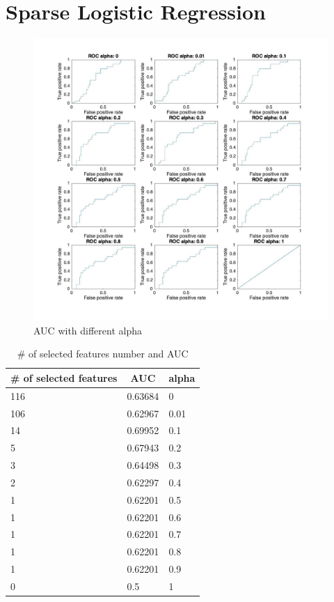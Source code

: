 \documentclass{article}
\begin{document}
\section{Sparse Logistic Regression} 
\begin{figure}
	\includegraphics[width = \linewidth]{../aucs.jpg}
	\caption{AUC with different alpha}
\end{figure}
\begin{table}[h!]
	\centering
	\begin{tabular}{lll}
	\multicolumn{1}{c}{\# of selected features} & \multicolumn{1}{c}{AUC} 
	& \multicolumn{1}{c}{alpha}\\
	\hline
	116& 0.63684&0\\
	106& 0.62967&0.01\\
	14& 0.69952&0.1\\
	5& 0.67943&0.2\\
	3& 0.64498&0.3\\
	2& 0.62297&0.4\\
	1& 0.62201&0.5\\
	1& 0.62201&0.6\\
	1& 0.62201&0.7\\
	1& 0.62201&0.8\\
	1& 0.62201&0.9\\
	0& 0.5  &1\\ 
	\end{tabular}
	\caption{\# of selected features number and AUC}
\end{table}
\end{document}
